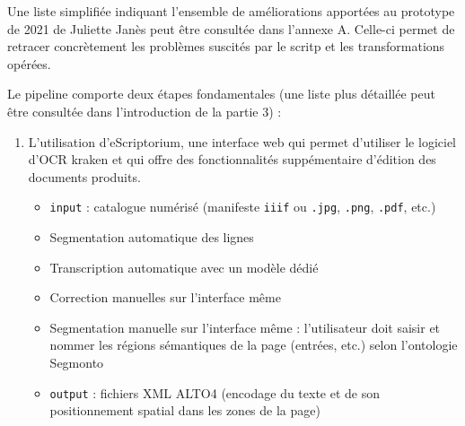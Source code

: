 \documentclass[a4paper,12pt,twoside]{book}
\begin{document}
Une liste simplifiée indiquant l'ensemble de améliorations apportées au prototype de 2021 de Juliette Janès peut être consultée dans l'annexe A. Celle-ci permet de retracer concrètement les problèmes suscités par le scritp et les transformations opérées. 

Le pipeline comporte deux étapes fondamentales (une liste plus détaillée peut être consultée dans l'introduction de la partie 3) : 

\begin{enumerate}
	\item L'utilisation d'eScriptorium, une interface web qui permet d'utiliser le logiciel d'OCR kraken et qui offre des fonctionnalités suppémentaire d'édition des documents produits. 
	\begin{itemize}
		\item \texttt{input} : catalogue numérisé (manifeste \texttt{iiif} ou \texttt{.jpg}, \texttt{.png}, \texttt{.pdf}, etc.)
		\item Segmentation automatique des lignes
		\item Transcription automatique avec un modèle dédié
		\item Correction manuelles sur l'interface même
		\item Segmentation manuelle sur l'interface même : l'utilisateur doit saisir et nommer les régions sémantiques de la page (entrées, etc.) selon l'ontologie Segmonto	
		\item \texttt{output} : fichiers XML ALTO4 (encodage du texte et de son positionnement spatial dans les zones de la page)
	\end{itemize}
	

\end{enumerate}
\end{document}
